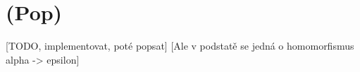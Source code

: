 \section{(Pop)}
[TODO, implementovat, poté popsat]
[Ale v podstatě se jedná o homomorfismus alpha -> epsilon]